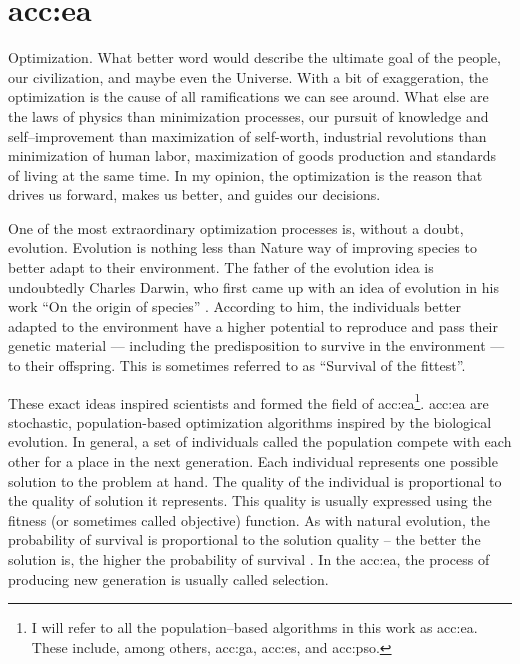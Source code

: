 \chapter{\texorpdfstring{\acrlong*{acc:ea}}{Evolutionary Algorithms}}
\label{chap:eva}

Optimization. What better word would describe the ultimate goal of the people, our civilization, and maybe even the Universe. With a bit of exaggeration, the optimization is the cause of all ramifications we can see around. What else are the laws of physics than minimization processes, our pursuit of knowledge and self--improvement than maximization of self-worth, industrial revolutions than minimization of human labor, maximization of goods production and standards of living at the same time. In my opinion, the optimization is the reason that drives us forward, makes us better, and guides our decisions.

One of the most extraordinary optimization processes is, without a doubt, evolution. Evolution is nothing less than Nature way of improving species to better adapt to their environment. The father of the evolution idea is undoubtedly Charles Darwin, who first came up with an idea of evolution in his work \enquote{On the origin of species} \citep{darwinOriginal}. According to him, the individuals better adapted to the environment have a higher potential to reproduce and pass their genetic material --- including the predisposition to survive in the environment --- to their offspring. This is sometimes referred to as \enquote{Survival of the fittest}.

These exact ideas inspired scientists and formed the field of \acrfull{acc:ea}\footnote{I will refer to all the population--based algorithms in this work as \acrlong*{acc:ea}. These include, among others, \acrlong*{acc:ga}, \acrlong*{acc:es}, and \acrlong*{acc:pso}.}.
\acrshort{acc:ea} are stochastic, population-based optimization algorithms inspired by the biological evolution. In general, a set of individuals called the population compete with each other for a place in the next generation. Each individual represents one possible solution to the problem at hand. The quality of the individual is proportional to the quality of solution it represents. This quality is usually expressed using the fitness (or sometimes called objective) function. As with natural evolution, the probability of survival is proportional to the solution quality -- the better the solution is, the higher the probability of survival \citep{IntroductionToEA}. In the \acrshort{acc:ea}, the process of producing new generation is usually called selection.

